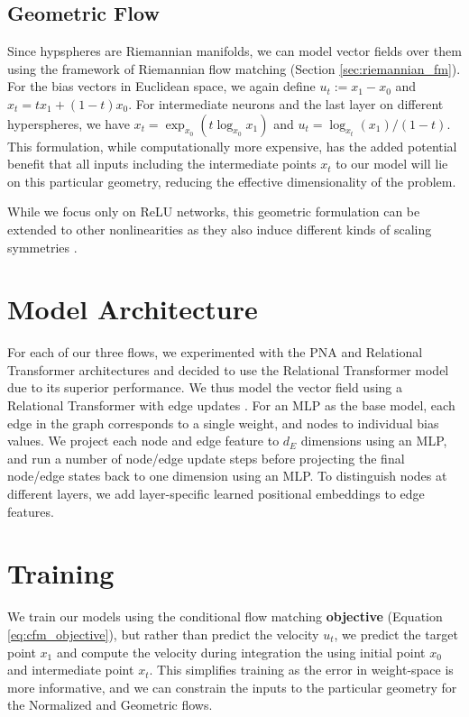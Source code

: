 \subsection{Geometric Flow}

Since hypspheres are Riemannian manifolds, we can model vector fields over them using the framework of Riemannian flow matching \citep{chenRiemannianFlowMatching2023} (Section \ref{sec:riemannian_fm}). For the bias vectors in Euclidean space, we again define $u_t := x_1 - x_0$ and $x_t = t x_1 + (1-t) x_0$. For intermediate neurons and the last layer on different hyperspheres, we have $x_t = \exp_{x_0}(t \log_{x_0}x_1)$ and $u_t = \log_{x_t}(x_1) / (1-t)$. This formulation, while computationally more expensive, has the added potential benefit that all inputs including the intermediate points $x_t$ to our model will lie on this particular geometry, reducing the effective dimensionality of the problem. 

While we focus only on ReLU networks, this geometric formulation can be extended to other nonlinearities as they also induce different kinds of scaling symmetries \citep{godfreySymmetriesDeepLearning2022}. 

\section{Model Architecture}

For each of our three flows, we experimented with the PNA and Relational Transformer architectures and decided to use the Relational Transformer model due to its superior performance. We thus model the vector field using a Relational Transformer with edge updates \citep{diaoRelationalAttentionGeneralizing2023,kofinasGraphNeuralNetworks2024}. For an MLP as the base model, each edge in the graph corresponds to a single weight, and nodes to individual bias values. We project each node and edge feature to $d_E$ dimensions using an MLP, and run a number of node/edge update steps before projecting the final node/edge states back to one dimension using an MLP. To distinguish nodes at different layers, we add layer-specific learned positional embeddings to edge features. 

\section{Training}

We train our models using the conditional flow matching \textbf{objective} (Equation \ref{eq:cfm_objective}), but rather than predict the velocity $u_t$, we predict the target point $x_1$ and compute the velocity during integration the using initial point $x_0$ and intermediate point $x_t$. This simplifies training as the error in weight-space is more informative, and we can constrain the inputs to the particular geometry for the Normalized and Geometric flows. 

